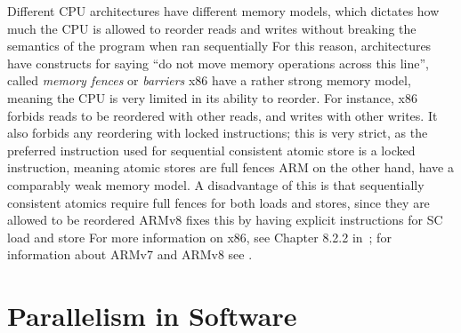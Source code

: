 \documentclass[b5paper]{report}
\begin{document}
 Different CPU architectures have different memory models, which
dictates how much the CPU is allowed to reorder reads and writes without
breaking the semantics of the program when ran sequentially For this reason,
architectures have constructs for saying ``do not move memory operations across
this line'', called \emph{memory fences} or \emph{barriers} x86 have a rather
strong memory model, meaning the CPU is very limited in its ability to reorder.
For instance, x86 forbids reads to be reordered with other reads, and writes
with other writes. It also forbids any reordering with locked instructions;
this is very strict, as the preferred instruction used for sequential
consistent atomic store is a locked instruction, meaning atomic stores are full
fences ARM on the other hand, have a comparably weak memory model. A
disadvantage of this is that sequentially consistent atomics require full fences
for both loads and stores, since they are allowed to be reordered ARMv8 fixes
this by having explicit instructions for SC load and store For more
information on x86, see Chapter 8.2.2 in~\cite{intel64}; for information about
ARMv7 and ARMv8 see .





\section{Parallelism in Software}
\end{document}
